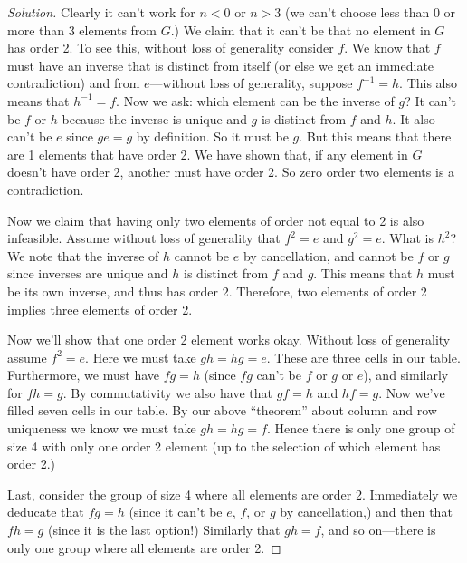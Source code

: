 \documentclass[fontsize=14pt]{scrartcl}
\theoremstyle{definition}
\newenvironment{solution}{
  \begin{proof}[Solution]
  \vspace{-8px}
  \setlength{\parskip}{4px}
  \setlength{\parindent}{0px}
}{
  \end{proof}
}
\newcommand{\inv}[1]{#1^{-1}}
\begin{document}
\begin{solution}
Clearly it can't work for $n<0$ or $n>3$ (we can't choose less than 0 or more
than 3 elements from $G$.) We claim that it can't be that no element in $G$ has
order 2. To see this, without loss of generality consider $f$. We know that $f$
must have an inverse that is distinct from itself (or else we get an immediate
contradiction) and from $e$---without loss of generality, suppose $\inv{f}=h$.
This also means that $\inv{h}=f$.  Now we ask: which element can be the inverse
of $g$? It can't be $f$ or $h$ because the inverse is unique and $g$ is distinct
from $f$ and $h$. It also can't be $e$ since $ge=g$ by definition.  So it must
be $g$. But this means that there are 1 elements that have order 2.  We have
shown that, if any element in $G$ doesn't have order 2, another must have order
2. So zero order two elements is a contradiction.

Now we claim that having only two elements of order not equal to 2 is also
infeasible. Assume without loss of generality that $f^2=e$ and $g^2=e$. What is
$h^2$? We note that the inverse of $h$ cannot be $e$ by cancellation, and cannot
be $f$ or $g$ since inverses are unique and $h$ is distinct from $f$ and $g$.
This means that $h$ must be its own inverse, and thus has order 2. Therefore,
two elements of order 2 implies three elements of order 2.

Now we'll show that one order 2 element works okay. Without loss of generality
assume $f^2=e$. Here we must take $gh=hg=e$. These are three cells in our table.
Furthermore, we must have $fg=h$ (since $fg$ can't be $f$ or $g$ or $e$), and
similarly for $fh=g$. By commutativity we also have that $gf=h$ and $hf=g$. Now
we've filled seven cells in our table. By our above ``theorem'' about column and
row uniqueness we know we must take $gh=hg=f$. Hence there is only one group of
size 4 with only one order 2 element (up to the selection of which element has
order 2.)

Last, consider the group of size 4 where all elements are order 2. Immediately
we deducate that $fg=h$ (since it can't be $e$, $f$, or $g$ by cancellation,)
and then that $fh=g$ (since it is the last option!) Similarly that $gh=f$, and
so on---there is only one group where all elements are order 2.
\end{solution}
\end{document}
